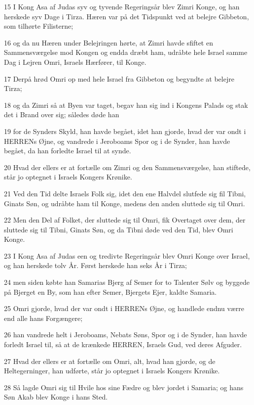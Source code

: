 \par 15 I Kong Asa af Judas syv og tyvende Regeringsår blev Zimri Konge, og han herskede syv Dage i Tirza. Hæren var på det Tidspunkt ved at belejre Gibbeton, som tilhørte Filisterne;
\par 16 og da nu Hæren under Belejringen hørte, at Zimri havde sfiftet en Sammensværgelse mod Kongen og endda dræbt ham, udråbte hele Israel samme Dag i Lejren Omri, Israels Hærfører, til Konge.
\par 17 Derpå hrød Omri op med hele Israel fra Gibbeton og begyndte at belejre Tirza;
\par 18 og da Zimri så at Byen var taget, begav han sig ind i Kongens Palads og stak det i Brand over sig; således døde han
\par 19 for de Synders Skyld, han havde begået, idet han gjorde, hvad der var ondt i HERRENs Øjne, og vandrede i Jeroboams Spor og i de Synder, han havde begået, da han forledte Israel til at synde.
\par 20 Hvad der ellers er at fortælle om Zimri og den Sammensværgelse, han stiftede, står jo optegnet i Israels Kongers Krønike.
\par 21 Ved den Tid delte Israels Folk sig, idet den ene Halvdel slutfede sig fil Tibni, Ginats Søn, og udråbte ham til Konge, medens den anden sluttede sig til Omri.
\par 22 Men den Del af Folket, der sluttede sig til Omri, fik Overtaget over dem, der sluttede sig til Tibni, Ginats Søn, og da Tibni døde ved den Tid, blev Omri Konge.
\par 23 I Kong Asa af Judas een og tredivte Regeringsår blev Omri Konge over Israel, og han herskede tolv År. Først herskede han seks År i Tirza;
\par 24 men siden købte han Samarias Bjerg af Semer for to Talenter Sølv og byggede på Bjerget en By, som han efter Semer, Bjergets Ejer, kaldte Samaria.
\par 25 Omri gjorde, hvad der var ondt i HERRENs Øjne, og handlede endnu værre end alle hans Forgængere;
\par 26 han vandrede helt i Jeroboams, Nebats Søns, Spor og i de Synder, han havde forledt Israel til, så at de krænkede HERREN, Israels Gud, ved deres Afguder.
\par 27 Hvad der ellers er at fortælle om Omri, alt, hvad han gjorde, og de Heltegerninger, han udførte, står jo optegnet i Israels Kongers Krønike.
\par 28 Så lagde Omri sig til Hvile hos sine Fædre og blev jordet i Samaria; og hans Søn Akab blev Konge i hans Sted.
